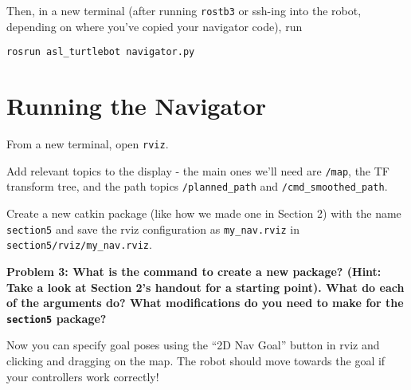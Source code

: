 \documentclass{article}
\begin{document}
Then, in a new terminal (after running \texttt{rostb3} or ssh-ing into the robot, depending on where you've copied your navigator code), run

\begin{lstlisting}
rosrun asl_turtlebot navigator.py
\end{lstlisting}

\section{Running the Navigator}

From a new terminal, open \texttt{rviz}. 

Add relevant topics to the display - the main ones we'll need are \texttt{/map}, the TF transform tree, and the path topics \texttt{/planned\_path} and \texttt{/cmd\_smoothed\_path}. 

Create a new catkin package (like how we made one in Section 2) with the name \texttt{section5} and save the rviz configuration as \texttt{my\_nav.rviz} in \texttt{section5/rviz/my\_nav.rviz}.

\textbf{Problem 3: What is the command to create a new package? (Hint: Take a look at Section 2's handout for a starting point). What do each of the arguments do? What modifications do you need to make for the \texttt{section5} package?}



Now you can specify goal poses using the ``2D Nav Goal'' button in rviz and clicking and dragging on the map. The robot should move towards the goal if your controllers work correctly!
\end{document}
